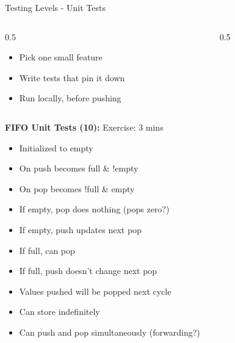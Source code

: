 \begin{frame}{Testing Levels - Unit Tests}

	\begin{columns}
		\begin{column}{0.5\textwidth}
			\begin{itemize}
				\item Pick one small feature
				\item Write tests that pin it down
				\item Run locally, before pushing
			\end{itemize}
		\end{column}
		\begin{column}{0.5\textwidth}
			\onslide<2->{
				\begin{center}
					\begin{tikzpicture}[scale=0.85]\fifobody{1}\end{tikzpicture}
				\end{center}
			}
		\end{column}
	\end{columns}
	\pause
	\vspace{0.5em}
	\textbf{FIFO Unit Tests (10):} Exercise: 3 mins
	\pause
	\begin{itemize}
		\item Initialized to empty
		\item On push becomes full \& !empty
		\item On pop becomes !full \& empty
		\item If empty, pop does nothing (pops zero?)
		\item If empty, push updates next pop
		\item If full, can pop
		\item If full, push doesn't change next pop
		\item Values pushed will be popped next cycle
		\item Can store indefinitely
		\item Can push and pop simultaneously (forwarding?)
	\end{itemize}

\end{frame}

